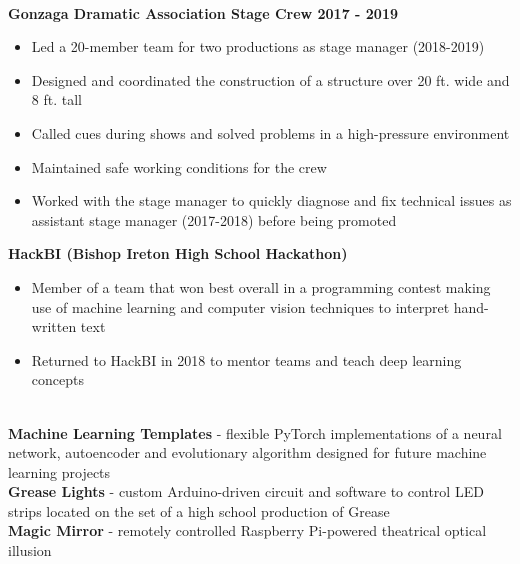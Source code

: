 \documentclass{article}
\begin{document}
\begin{center}
\begin{flushleft}
    {\large\textbf{\underline{}}} \\
    \textbf{Gonzaga Dramatic Association Stage Crew \hfill 2017 - 2019}
    \begin{itemize}
      \item Led a 20-member team for two productions as stage manager (2018-2019)
      \item Designed and coordinated the construction of a structure over 20 ft. wide and 8 ft. tall
      \item Called cues during shows and solved problems in a high-pressure environment
      \item Maintained safe working conditions for the crew
      \item Worked with the stage manager to quickly diagnose and fix technical issues as assistant stage manager (2017-2018) before being promoted
    \end{itemize}

    \textbf{HackBI  (Bishop Ireton High School Hackathon)}

    \begin{itemize}
      \item Member of a team that won best overall in a programming contest making use of machine learning and computer vision techniques to interpret hand-written text
      \item Returned to HackBI in 2018 to mentor teams and teach deep learning concepts
    \end{itemize}

    {\large\textbf{\underline{}}} \\
    \textbf{Machine Learning Templates} - flexible PyTorch implementations of a neural network, autoencoder and evolutionary algorithm designed for future machine learning projects \\
    \textbf{Grease Lights} - custom Arduino-driven circuit and software to control LED strips located on the set of a high school production of Grease \\
    \textbf{Magic Mirror} - remotely controlled Raspberry Pi-powered theatrical optical illusion



  \end{flushleft}
  \end{center}
\end{document}
